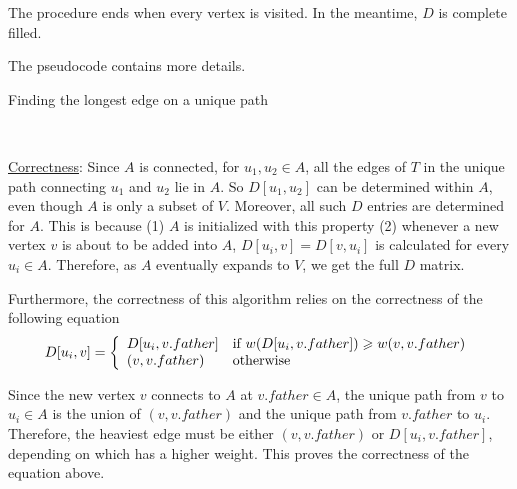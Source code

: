 \documentclass{article}
\begin{document}
The procedure ends when every vertex is visited. In the meantime, $D$ is complete filled.

The pseudocode contains more details.
\begin{algorithm}
\caption{Finding the longest edge on a unique path}
\begin{algorithmic}[1]
\EndProcedure

	\Return{}
\Else{}
			\Else{}
			\EndIf
		\EndFor
	\EndFor
	\State\Return{}
\EndIf
\EndProcedure
\end{algorithmic}
\end{algorithm}

~

\noindent\underline{Correctness}: Since $A$ is connected, for $u_1,u_2\in A$, all the edges of $T$ in the unique path connecting $u_1$ and $u_2$ lie in $A$. So $D[u_1,u_2]$ can be determined within $A$, even though $A$ is only a subset of $V$. Moreover, all such $D$ entries are determined for $A$. This is because (1) $A$ is initialized with this property (2) whenever a new vertex $v$ is about to be added into $A$, $D[u_i,v]=D[v,u_i]$ is calculated for every $u_i\in A$. Therefore, as $A$ eventually expands to $V$, we get the full $D$ matrix.

Furthermore, the correctness of this algorithm relies on the correctness of the following equation
\begin{equation*}
D[u_i,v]=\left\{\begin{array}{ll}D[u_i,v.father]&\textup{if }w(D[u_i,v.father])\geqslant w(v,v.father)\\(v,v.father)&\textup{otherwise}\end{array}\right.
\end{equation*}

Since the new vertex $v$ connects to $A$ at $v.father\in A$, the unique path from $v$ to $u_i\in A$ is the union of $(v,v.father)$ and the unique path from $v.father$ to $u_i$. Therefore, the heaviest edge must be either $(v,v.father)$ or $D[u_i,v.father]$, depending on which has a higher weight. This proves the correctness of the equation above.
\end{document}
